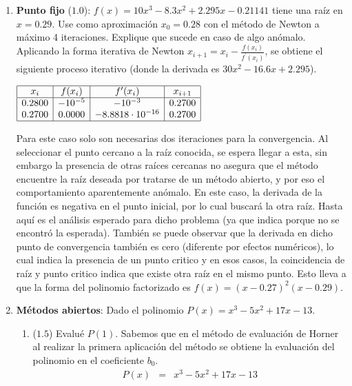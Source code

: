 \documentclass[12pt]{article}
\begin{document}
  \begin{enumerate}[leftmargin=*,widest=9]
    \item \textbf{Punto fijo} ($1.0$): \(f(x) = 10x^3 - 8.3x^2 + 2.295x - 0.21141\) tiene una raíz en \(x=0.29\). Use como aproximación \(x_0=0.28\) con el método de Newton a máximo 4 iteraciones. Explique que sucede en caso de algo anómalo.
    Aplicando la forma iterativa de Newton \(x_{i+1} = x_i - \frac{f(x_i)}{f^\prime (x_i)} \), se obtiene el siguiente proceso iterativo (donde la derivada es \(30x^2 - 16.6x + 2.295 \)).
    \begin{center}
       \(
    \begin{array}{|c|c|c|c|}
    \hline
    x_i & f(x_i) & f^\prime (x_i) & x_{i+1} \\
    \hline
    0.2800 & -10^{-5} & -10^{-3} & 0.2700\\
    0.2700 & 0.0000 & -8.8818\cdot 10^{-16} & 0.2700\\
    \hline
    \end{array}
    \) 
    \end{center}
Para este caso solo son necesarias dos iteraciones para la convergencia. Al seleccionar el punto cercano a la raíz conocida, se espera llegar a esta, sin embargo la presencia de otras raíces cercanas no asegura que el método encuentre la raíz deseada por tratarse de un método abierto, y por eso el comportamiento aparentemente anómalo. En este caso, la derivada de la función es negativa en el punto inicial, por lo cual buscará la otra raíz. Hasta aquí es el análisis esperado para dicho problema (ya que indica porque no se encontró la esperada).
También se puede observar que la derivada en dicho punto de convergencia también es cero (diferente por efectos numéricos), lo cual indica la presencia de un punto critico y en esos casos, la coincidencia de raíz y punto critico indica que existe otra raíz en el mismo punto. Esto lleva a que la forma del polinomio factorizado es \(f(x) = (x-0.27)^2(x-0.29)\).
    \item \textbf{Métodos abiertos}: Dado el polinomio \(P(x) = x^3 - 5x^2 + 17x -13\). 
    \begin{enumerate}[label=\alph*]
    \item ($1.5$) Evalué \(P(1)\).
    Sabemos que en el método de evaluación de Horner al realizar la primera aplicación del método se obtiene la evaluación del polinomio en el coeficiente \(b_0\).
\begin{eqnarray*}
P(x) & = & x^3 - 5x^2 + 17x -13\\

\end{eqnarray*}
\end{enumerate}
\end{enumerate}
\end{document}
